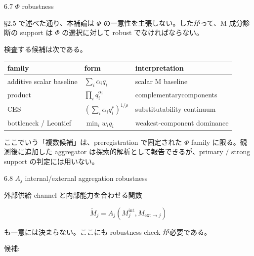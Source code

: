 \documentclass[12pt,a4paper]{article}
\begin{document}
6.7 \(\Phi\) robustness

§2.5 で述べた通り、本補論は \(\Phi\) の一意性を主張しない。したがって、M 成分診断の support は \(\Phi\) の選択に対して robust でなければならない。

検査する候補は次である。

{\def\LTcaptype{table} %
\begin{longtable}[]{@{}
  >{\raggedright\arraybackslash}p{}
  >{\raggedright\arraybackslash}p{}
  >{\raggedright\arraybackslash}p{}@{}}
\toprule\noalign{}
\begin{minipage}[b]{\linewidth}\raggedright
family
\end{minipage} & \begin{minipage}[b]{\linewidth}\raggedright
form
\end{minipage} & \begin{minipage}[b]{\linewidth}\raggedright
interpretation
\end{minipage} \\
\midrule\noalign{}
\endhead
\bottomrule\noalign{}
\endlastfoot
additive scalar baseline & \(\sum_i \alpha_i q_i\) & scalar M baseline \\
product & \(\prod_i q_i^{\alpha_i}\) & complementarycomponents \\
CES & \((\sum_i \alpha_i q_i^\rho)^{1/\rho}\) & substitutability continuum \\
bottleneck / Leontief & \(\min_i w_i q_i\) & weakest-component dominance \\
\end{longtable}
}

ここでいう「複数候補」は、preregistration で固定された \(\Phi\) family に限る。観測後に追加した aggregator は探索的解析として報告できるが、primary / strong support の判定には用いない。

6.8 \(A_j\) internal/external aggregation robustness

外部供給 channel と内部能力を合わせる関数

\[
\widetilde M_{j} = A_{j}(M_{j}^{\mathrm{int}}, M_{\mathrm{ext}\to j})
\]

も一意には決まらない。ここにも robustness check が必要である。

候補:
\end{document}

